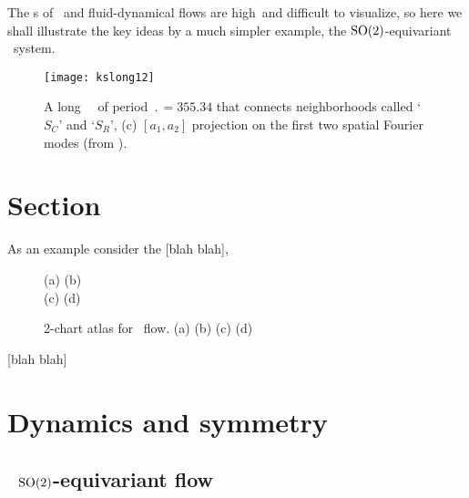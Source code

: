 \documentclass[aip,cha,
secnumarabic,
nofootinbib, tightenlines,
nobibnotes, showkeys, showpacs,
groupedaddress,
preprint,%
]{revtex4-1}
\begin{document}
The \statesp s of \KS\ and fluid-dynamical flows are high\dmn\ and
difficult to visualize, so here we shall illustrate the key ideas by a
much simpler example, the $\textrm{SO}(2)$-equivariant  \twoMode\ system.

\begin{figure} %
    \centering
\texttt{[image: kslong12]}
\caption[]{
A long \KS\ \po\ of period $\period{}=355.34$ that connects
neighborhoods called `$S_C$' and `$S_R$',
(c) $[a_1,a_2]$  projection on the first two spatial Fourier modes
(from ).
      }
\label{f:antlong}
\end{figure}


\section{Section}
\label{s:cut}


As an example consider the  [blah blah],

\begin{figure}
 \begin{center}
 \setlength{\unitlength}{0.20\textwidth}
(a)
(b)
\\
(c)
(d)
 \end{center}
    \caption{
2-chart atlas for \twoMode\ flow.
(a)
(b)
(c)
(d)
    }
\label{fig:2modeSects}
\end{figure}

 [blah blah]

\section{Dynamics and symmetry}
\label{s:symm}

\subsection{\twoMode\ $\textrm{SO}(2)$-equivariant flow}
\label{s:twoMode}
\end{document}
